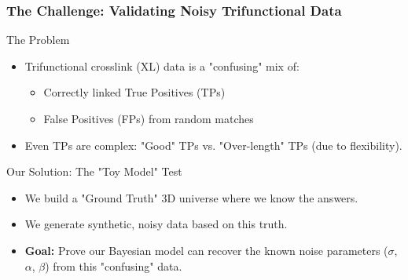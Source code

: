 \documentclass[a4paper,8pt]{beamer}
\begin{document}
\begin{frame}
\frametitle{The Challenge: Validating Noisy Trifunctional Data}
    
    \begin{block}{The Problem}
        \begin{itemize}
            \item Trifunctional crosslink (XL) data is a "confusing" mix of:
                \begin{itemize}
                    \item Correctly linked True Positives (TPs)
                    \item False Positives (FPs) from random matches
                \end{itemize}
            \item Even TPs are complex: "Good" TPs vs. "Over-length" TPs (due to flexibility).
        \end{itemize}
    \end{block}
    
    \vfill
    
    \begin{block}{Our Solution: The "Toy Model" Test}
        \begin{itemize}
            \item We build a "Ground Truth" 3D universe where we know the answers.
            \item We generate synthetic, noisy data based on this truth.
            \item \textbf{Goal:} Prove our Bayesian model can recover the known noise parameters ($\sigma$, $\alpha$, $\beta$) from this "confusing" data.
        \end{itemize}
    \end{block}

\end{frame}
\end{document}
